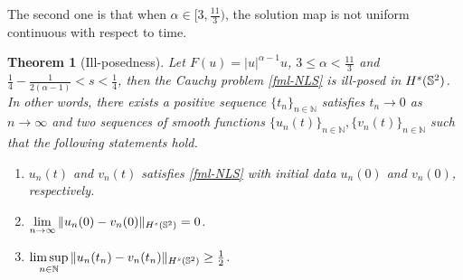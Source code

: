 \documentclass[11pt, reqno]{amsart}
\numberwithin{equation}{section}
\newtheorem{theorem}{Theorem}[section]
\theoremstyle{definition}
\theoremstyle{remark}
\begin{document}
The second one is that when $\alpha\in[3,\frac{11}{3})$, the solution map is not uniform continuous with respect to time.  
\begin{theorem}[Ill-posedness]\label{thm-illpose2}
Let $F(u) = |u|^{\alpha-1}u$, $3\leq \alpha< \frac{11}{3}$ and $\frac{1}{4}-\frac{1}{2(\alpha-1)}<s<\frac{1}{4}$, then the Cauchy problem \eqref{fml-NLS} is ill-posed in $H^s(\Bbb S^2)$. In other words, there exists a positive sequence $\{t_n\}_{n\in\mathbb{N}}$ satisfies $t_n\to 0$ as $n\to\infty$ and two sequences of smooth functions $\{u_n(t)\}_{n\in\mathbb{N}},\{v_n(t)\}_{n\in\mathbb{N}}$ such that the following statements hold.
\begin{enumerate}
\item $u_n(t)$ and $v_n(t)$ satisfies \eqref{fml-NLS} with initial data $u_n(0)$ and $v_n(0)$, respectively.
\item $\lim\limits_{n\to\infty}\|u_n(0)-v_n(0)\|_{H^s(\Bbb S^2)} = 0$.
\item $\limsup\limits_{n\in \mathbb{N}}\|u_n(t_n)-v_n(t_n)\|_{H^s(\Bbb S^2)} \ge \frac{1}{2}$. 
\end{enumerate}
\end{theorem}
	
\end{document}
